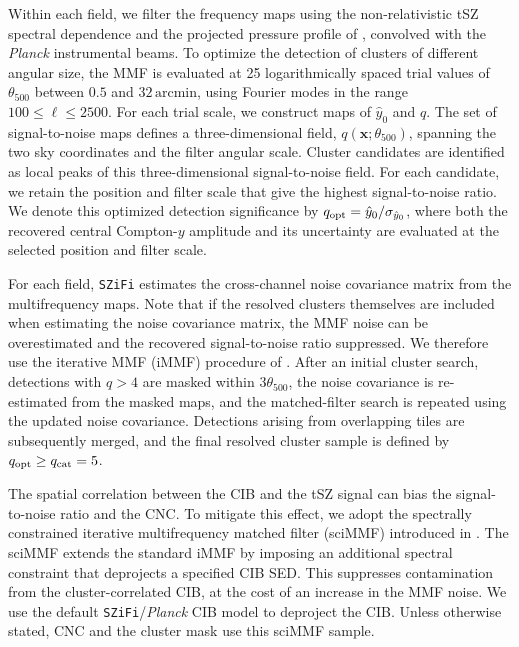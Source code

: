 \documentclass[aps,prd,twocolumn,superscriptaddress,nofootinbib,floatfix]{revtex4-2}
\begin{document}
Within each field, we filter the frequency maps using the non-relativistic tSZ spectral dependence and the projected pressure profile of \citet{Arnaud2010}, convolved with the \textit{Planck} instrumental beams. To optimize the detection of clusters of different angular size, the MMF is evaluated at 25 logarithmically spaced trial values of $\theta_{500}$ between $0.5$ and $32\,\mathrm{arcmin}$, using Fourier modes in the range $100 \leq \ell \leq 2500$. For each trial scale, we construct maps of $\hat{y}_0$ and $q$. The set of signal-to-noise maps defines a three-dimensional field, $q(\boldsymbol{x};\theta_{500})$, spanning the two sky coordinates and the filter angular scale. Cluster candidates are identified as local peaks of this three-dimensional signal-to-noise field. For each candidate, we retain the position and filter scale that give the highest signal-to-noise ratio. We denote this optimized detection significance by $q_{\rm opt} = \hat{y}_0/\sigma_{\hat{y}_0}$, where both the recovered central Compton-$y$ amplitude and its uncertainty are evaluated at the selected position and filter scale.

For each field, \texttt{SZiFi} estimates the cross-channel noise covariance matrix from the multifrequency maps. Note that if the resolved clusters themselves are included when estimating the noise covariance matrix, the MMF noise can be overestimated and the recovered signal-to-noise ratio suppressed. We therefore use the iterative MMF (iMMF) procedure of \citet{Zubeldia_2023}. After an initial cluster search, detections with $q>4$ are masked within $3\theta_{500}$, the noise covariance is re-estimated from the masked maps, and the matched-filter search is repeated using the updated noise covariance. Detections arising from overlapping tiles are subsequently merged, and the final resolved cluster sample is defined by $q_{\rm opt}\geq q_{\rm cat}=5$.

The spatial correlation between the CIB and the tSZ signal can bias the signal-to-noise ratio and the CNC. To mitigate this effect, we adopt the spectrally constrained iterative multifrequency matched filter (sciMMF) introduced in \citet{2023MNRAS.522.5123Z}. The sciMMF extends the standard iMMF by imposing an additional spectral constraint that deprojects a specified CIB SED. This suppresses contamination from the cluster-correlated CIB, at the cost of an increase in the MMF noise. We use the default \texttt{SZiFi}/\textit{Planck} CIB model to deproject the CIB. Unless otherwise stated, CNC and the cluster mask use this sciMMF sample.
\end{document}
